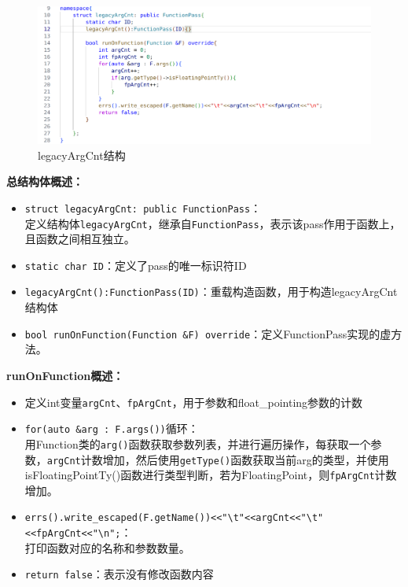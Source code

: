 \documentclass[11pt, a4paper, oneside,UTF8]{ctexart}
\begin{document}
\begin{figure}[h]
    \centering
    \includegraphics[width=1\textwidth]{./figure/legacy_2.png}
    \caption{legacyArgCnt结构}
    \label{figure:1.2}
\end{figure}

\textbf{总结构体概述：}
\begin{itemize}[before=]
    \setlength{\itemsep}{0em}
    \item \texttt{struct legacyArgCnt: public FunctionPass}：\\定义结构体\texttt{legacyArgCnt}，继承自\texttt{FunctionPass}，表示该pass作用于函数上，且函数之间相互独立。
    \item \texttt{static\ char ID}：定义了pass的唯一标识符ID
    \item \texttt{legacyArgCnt():FunctionPass(ID){}}：重载构造函数，用于构造legacyArgCnt结构体
    \item \texttt{bool runOnFunction(Function \&F) override}：定义FunctionPass实现的虚方法。
\end{itemize}

\textbf{runOnFunction概述：}
\begin{itemize}[before=]
    \setlength{\itemsep}{0em}
    \item 定义int变量\texttt{argCnt}、\texttt{fpArgCnt}，用于参数和float\_pointing参数的计数
    \item \texttt{for(auto \&arg : F.args())}循环：\\用Function类的\texttt{arg()}函数获取参数列表，并进行遍历操作，每获取一个参数，\texttt{argCnt}计数增加，然后使用\texttt{getType()}函数获取当前arg的类型，并使用{isFloatingPointTy()}函数进行类型判断，若为FloatingPoint，则\texttt{fpArgCnt}计数增加。
    \item \texttt{errs().write\_escaped(F.getName())<<"\textbackslash t"<<argCnt<<"\textbackslash t"<<fpArgCnt<<"\textbackslash n";}：\\打印函数对应的名称和参数数量。
    \item \texttt{return false}：表示没有修改函数内容
\end{itemize}
\end{document}
